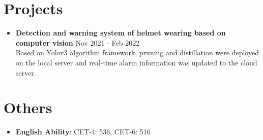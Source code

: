 \documentclass[letterpaper,11pt]{article}
\newcommand{\resumeItems}[2]{
    \item #1 \hfill #2 \\
}
\newcommand{\resumeListStart}{\begin{itemize}[leftmargin=*]}
\newcommand{\resumeListEnd}{\end{itemize}}
\begin{document}
\section{Projects}
    \resumeListStart
        \resumeItems
        {\textbf{Detection and warning system of helmet wearing based on computer vision}}
        {Nov 2021 - Feb 2022}
        \vspace*{1mm}
        {Based on Yolov3 algorithm framework, pruning and distillation were deployed on the local server and real-time alarm information was updated to the cloud server.}
    \resumeListEnd


\section{Others}
    \resumeListStart
        \item \textbf{English Ability}{: CET-4: 536, CET-6: 516}
    \resumeListEnd
\end{document}
